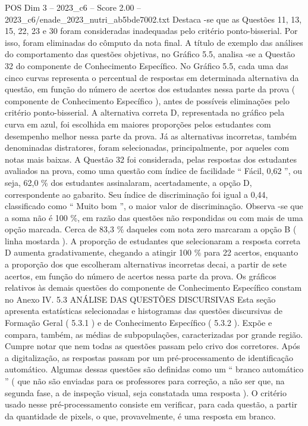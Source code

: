 \begin{textsample}{POS Dim 3 – 2023\_c6 – Score 2.00 – 2023\_c6/enade\_2023\_nutri\_ab5bde7002.txt}
Destaca -se que as Questões 11, 13, 15, 22, 23 e 30 foram consideradas inadequadas pelo critério ponto-bisserial.
Por isso, foram eliminadas do cômputo da nota final.
A título de exemplo das análises do comportamento das questões objetivas, no Gráfico 5.5, analisa -se a Questão 32 do componente de Conhecimento Específico.
No Gráfico 5.5, cada uma das cinco curvas representa o percentual de respostas em determinada alternativa da questão, em função do número de acertos dos estudantes nessa parte da prova ( componente de Conhecimento Específico ), antes de possíveis eliminações pelo critério ponto-bisserial.
A alternativa correta D, representada no gráfico pela curva em azul, foi escolhida em maiores proporções pelos estudantes com desempenho melhor nessa parte da prova.
Já as alternativas incorretas, também denominadas distratores, foram selecionadas, principalmente, por aqueles com notas mais baixas.
A Questão 32 foi considerada, pelas respostas dos estudantes avaliados na prova, como uma questão com índice de facilidade “ Fácil, 0,62 ”, ou seja, 62,0 \% dos estudantes assinalaram, acertadamente, a opção D, correspondente ao gabarito.
Seu índice de discriminação foi igual a 0,44, classificado como “ Muito bom ”, o maior valor de discriminação.
Observa -se que a soma não é 100 \%, em razão das questões não respondidas ou com mais de uma opção marcada.
Cerca de 83,3 \% daqueles com nota zero marcaram a opção B ( linha mostarda ).
A proporção de estudantes que selecionaram a resposta correta D aumenta gradativamente, chegando a atingir 100 \% para 22 acertos, enquanto a proporção dos que escolheram alternativas incorretas decai, a partir de sete acertos, em função do número de acertos nessa parte da prova.
Os gráficos relativos às demais questões do componente de Conhecimento Específico constam no Anexo IV. 5.3 ANÁLISE DAS QUESTÕES DISCURSIVAS Esta seção apresenta estatísticas selecionadas e histogramas das questões discursivas de Formação Geral ( 5.3.1 ) e de Conhecimento Específico ( 5.3.2 ).
Expõe e compara, também, as médias de subpopulações, caracterizadas por grande região.
Cumpre notar que nem todas as questões passam pelo crivo dos corretores.
Após a digitalização, as respostas passam por um pré-processamento de identificação automático.
Algumas dessas questões são definidas como um “ branco automático ” ( que não são enviadas para os professores para correção, a não ser que, na segunda fase, a de inspeção visual, seja constatada uma resposta ).
O critério usado nesse pré-processamento consiste em verificar, para cada questão, a partir da quantidade de pixels, o que, provavelmente, é uma resposta em branco.

\end{textsample}
